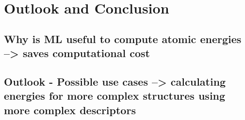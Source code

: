 \chapter{Outlook and Conclusion}

\section{Why is ML useful to compute atomic energies --> saves computational cost}
\section{Outlook - Possible use cases --> calculating energies for more complex structures  using more complex descriptors}